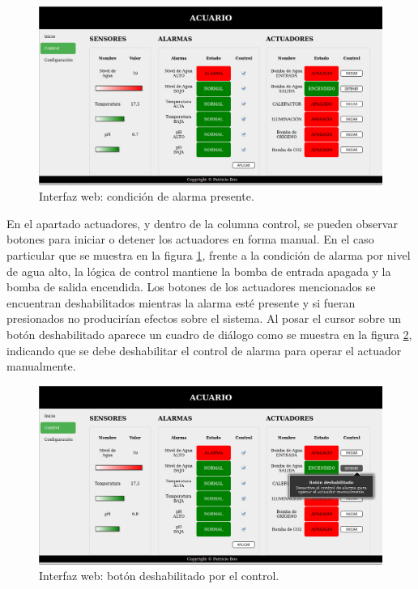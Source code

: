 \begin{figure}[hp]
	\centering
    \includegraphics[width=\textwidth]{./Figures/interfaz_control_alarma1}
	\caption{Interfaz web: condición de alarma presente.}	
	\label{fig:interfaz3}
\end{figure}

\vspace{35px}

En el apartado actuadores, y dentro de la columna control, se pueden observar botones para iniciar o detener los actuadores en forma manual.  En el caso particular que se muestra en la figura \ref{fig:interfaz3}, frente a la condición de alarma por nivel de agua alto, la lógica de control mantiene la bomba de entrada apagada y la bomba de salida encendida.  Los botones de los actuadores mencionados se encuentran deshabilitados mientras la alarma esté presente y si fueran presionados no producirían efectos sobre el sistema.  Al posar el cursor sobre un botón deshabilitado aparece un cuadro de diálogo como se muestra en la figura \ref{fig:interfaz4}, indicando que se debe deshabilitar el control de alarma para operar el actuador manualmente.



\begin{figure}[ht!]
	\centering
    \includegraphics[width=1\textwidth]{./Figures/interfaz_control_alarma2}
	\caption{Interfaz web: botón deshabilitado por el control.}
	\label{fig:interfaz4}
\end{figure}

